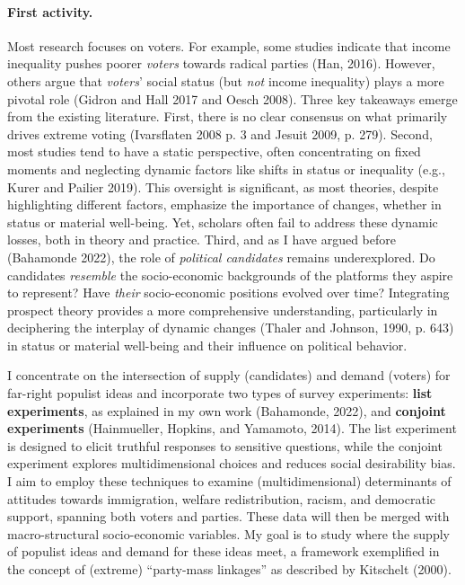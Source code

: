 \documentclass[letterpaper]{article}
\begin{document}
\paragraph{First activity.} Most research focuses on voters. For example, some studies indicate that income inequality pushes poorer \emph{voters} towards radical parties (Han, 2016). However, others argue that \emph{voters}' social status (but \emph{not} income inequality) plays a more pivotal role (Gidron and Hall 2017 and Oesch 2008). Three key takeaways emerge from the existing literature. First, there is no clear consensus on what primarily drives extreme voting (Ivarsflaten 2008 p. 3 and Jesuit 2009, p. 279). Second, most studies tend to have a static perspective, often concentrating on fixed moments and neglecting dynamic factors like shifts in status or inequality (e.g., Kurer and Pailier 2019). This oversight is significant, as most theories, despite highlighting different factors, emphasize the importance of changes, whether in status or material well-being. Yet, scholars often fail to address these dynamic losses, both in theory and practice. Third, and as I have argued before (Bahamonde 2022), the role of \emph{political candidates} remains underexplored. Do candidates \emph{resemble} the socio-economic backgrounds of the platforms they aspire to represent? Have \emph{their} socio-economic positions evolved over time? Integrating prospect theory provides a more comprehensive understanding, particularly in deciphering the interplay of dynamic changes (Thaler and Johnson, 1990, p. 643) in status or material well-being and their influence on political behavior.

\vspace{2mm}I concentrate on the intersection of supply (candidates) and demand (voters) for far-right populist ideas and incorporate two types of survey experiments: {\bf list experiments}, as explained in my own work (Bahamonde, 2022), and {\bf conjoint experiments} (Hainmueller, Hopkins, and Yamamoto, 2014). The list experiment is designed to elicit truthful responses to sensitive questions, while the conjoint experiment explores multidimensional choices and reduces social desirability bias. I aim to employ these techniques to examine (multidimensional) determinants of attitudes towards immigration, welfare redistribution, racism, and democratic support, spanning both voters and parties. These data will then be merged with macro-structural socio-economic variables. My goal is to study where the supply of populist ideas and demand for these ideas meet, a framework exemplified in the concept of (extreme) ``party-mass linkages'' as described by Kitschelt (2000). 
\end{document}
